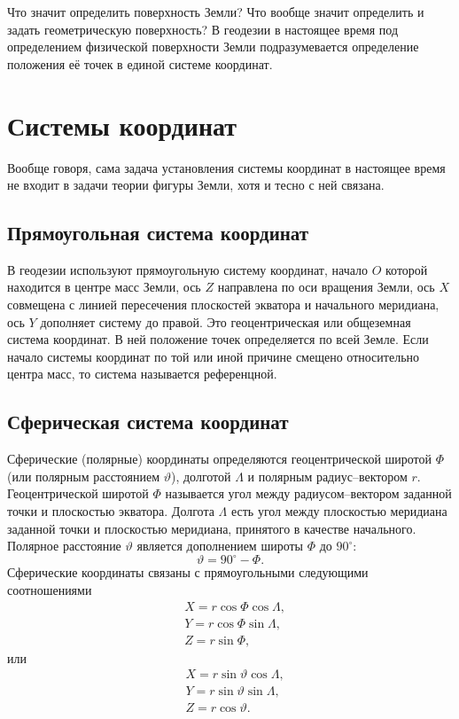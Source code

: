 \documentclass[11pt, a4paper]{article}
\theoremstyle{plain}
\theoremstyle{definition}
\theoremstyle{remark}
\renewcommand{\theta}{\vartheta}
\begin{document}
Что значит определить поверхность Земли? Что вообще значит определить и задать геометрическую
поверхность? В геодезии в настоящее время под определением физической поверхности Земли подразумевается определение
положения её точек в единой системе координат. 

\section{Системы координат}

Вообще говоря, сама задача установления системы координат в настоящее время не входит в задачи
теории фигуры Земли, хотя и тесно с ней связана.

\subsection{Прямоугольная система координат}
В геодезии используют прямоугольную систему координат, начало $O$ которой находится в центре масс
Земли, ось $Z$ направлена по оси вращения Земли, ось $X$ совмещена с линией пересечения плоскостей
экватора и начального меридиана, ось $Y$ дополняет систему до правой\cite{Ogorodova2006}. 
Это геоцентрическая или общеземная система координат. В ней положение точек определяется по всей
Земле. Если начало системы координат по той или иной причине смещено относительно центра масс, то система
называется референцной.

\subsection{Сферическая система координат}

Сферические (полярные) координаты определяются геоцентрической широтой $\Phi$ (или полярным
расстоянием $\theta$), долготой $\Lambda$ и полярным радиус--вектором $r$.
Геоцентрической широтой $\Phi$ называется угол между радиусом--вектором заданной точки и плоскостью экватора. Долгота $\Lambda$ есть угол между
плоскостью меридиана заданной точки и плоскостью меридиана, принятого в качестве начального.
Полярное расстояние $\theta$ является дополнением широты $\Phi$ до $90^\circ$:
\begin{equation*}
    \theta = 90^\circ - \Phi.
\end{equation*}
Сферические координаты связаны с прямоугольными следующими соотношениями
\begin{align*}
    &X = r\cos\Phi\cos\Lambda,\\
    &Y = r\cos\Phi\sin\Lambda,\\
    &Z = r\sin\Phi,
\end{align*}
или
\begin{align*}
    &X = r\sin\theta\cos\Lambda,\\
    &Y = r\sin\theta\sin\Lambda,\\
    &Z = r\cos\theta.
\end{align*}
\end{document}
